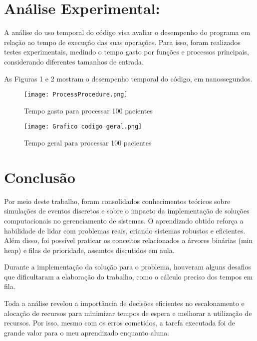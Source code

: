 \documentclass[11pt]{article}
\begin{document}
\section*{Análise Experimental:}

\par A análise do uso temporal do código visa avaliar o desempenho do programa em relação ao tempo de execução das suas operações. Para isso, foram realizados testes experimentais, medindo o tempo gasto por funções e processos principais, considerando diferentes tamanhos de entrada.
\par As Figuras 1 e 2 mostram o desempenho temporal do código, em nanossegundos.

\begin{figure}
    \centering
    \texttt{[image: ProcessProcedure.png]}
    \caption{Tempo gasto para processar 100 pacientes}
    \label{fig:enter-label}
\end{figure}

\begin{figure}
    \centering
    \texttt{[image: Grafico codigo geral.png]}
    \caption{Tempo geral para processar 100 pacientes}
    \label{fig:enter-label}
\end{figure}



\section*{Conclusão}    
    \par Por meio deste trabalho, foram consolidados conhecimentos teóricos sobre simulações de eventos discretos e sobre o impacto da implementação de soluções computacionais no gerenciamento de sistemas. O aprendizado obtido reforça a habilidade de lidar com problemas reais, criando sistemas robustos e eficientes. Além disso, foi possível praticar os conceitos relacionados a árvores binárias (min heap) e filas de prioridade, assuntos discutidos em aula. 
    
    \par Durante a implementação da solução para o problema, houveram alguns desafios que dificultaram a elaboração do trabalho, como o cálculo preciso dos tempos em fila.
    
    \par Toda a análise revelou a importância de decisões eficientes no escalonamento e alocação de recursos para minimizar tempos de espera e melhorar a utilização de recursos. Por isso, mesmo com os erros cometidos, a tarefa executada foi de grande valor para o meu aprendizado enquanto aluna.
\end{document}
